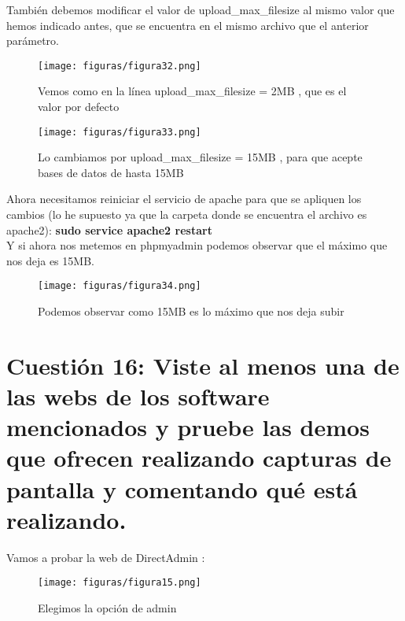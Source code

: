 También debemos modificar el valor de upload\_max\_filesize al mismo valor que hemos indicado antes, que se encuentra en el mismo archivo que el anterior parámetro.

\begin{figure}[H] %
	\centering
	\texttt{[image: figuras/figura32.png]}  %
	\label{figura32}
	
	\caption{Vemos como en la línea  upload\_max\_filesize = 2MB , que es el valor por defecto } 
\end{figure}

\begin{figure}[H] %
	\centering
	\texttt{[image: figuras/figura33.png]}  %
	\label{figura33}
	
	\caption{Lo cambiamos por  upload\_max\_filesize = 15MB , para que acepte bases de datos de hasta 15MB} 
\end{figure}
Ahora necesitamos reiniciar el servicio de apache para que se apliquen los cambios (lo he supuesto ya que la carpeta donde se encuentra el archivo es apache2):
\textbf{sudo service apache2 restart}\\

Y si ahora nos metemos en phpmyadmin podemos observar que el máximo que nos deja es 15MB.

\begin{figure}[H] %
	\centering
	\texttt{[image: figuras/figura34.png]}  %
	\label{figura34}
	
	\caption{Podemos observar como 15MB es lo máximo que nos deja subir} 
\end{figure}

\section{Cuestión 16: Viste al menos una de las webs de los software mencionados y pruebe las demos que ofrecen realizando capturas de pantalla y comentando qué está realizando.}
Vamos a probar la web de DirectAdmin \cite{directadmin}:\\
\begin{figure}[H] %
	\centering
	\texttt{[image: figuras/figura15.png]}  %
	\label{figura15}
	
	\caption{Elegimos la opción de admin} 
\end{figure}

